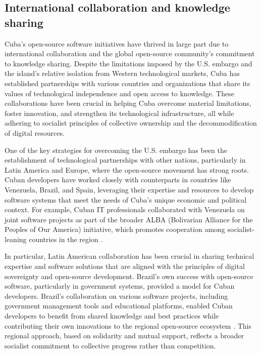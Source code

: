 \begin{refsection}
\subsection{International collaboration and knowledge sharing}

Cuba’s open-source software initiatives have thrived in large part due to international collaboration and the global open-source community’s commitment to knowledge sharing. Despite the limitations imposed by the U.S. embargo and the island’s relative isolation from Western technological markets, Cuba has established partnerships with various countries and organizations that share its values of technological independence and open access to knowledge. These collaborations have been crucial in helping Cuba overcome material limitations, foster innovation, and strengthen its technological infrastructure, all while adhering to socialist principles of collective ownership and the decommodification of digital resources.

One of the key strategies for overcoming the U.S. embargo has been the establishment of technological partnerships with other nations, particularly in Latin America and Europe, where the open-source movement has strong roots. Cuban developers have worked closely with counterparts in countries like Venezuela, Brazil, and Spain, leveraging their expertise and resources to develop software systems that meet the needs of Cuba’s unique economic and political context. For example, Cuban IT professionals collaborated with Venezuela on joint software projects as part of the broader ALBA (Bolivarian Alliance for the Peoples of Our America) initiative, which promotes cooperation among socialist-leaning countries in the region \cite[pp.~78-98]{kapcia}.

In particular, Latin American collaboration has been crucial in sharing technical expertise and software solutions that are aligned with the principles of digital sovereignty and open-source development. Brazil’s own success with open-source software, particularly in government systems, provided a model for Cuban developers. Brazil’s collaboration on various software projects, including government management tools and educational platforms, enabled Cuban developers to benefit from shared knowledge and best practices while contributing their own innovations to the regional open-source ecosystem \cite[pp.~134-157]{feinberg}. This regional approach, based on solidarity and mutual support, reflects a broader socialist commitment to collective progress rather than competition.


\end{refsection}
